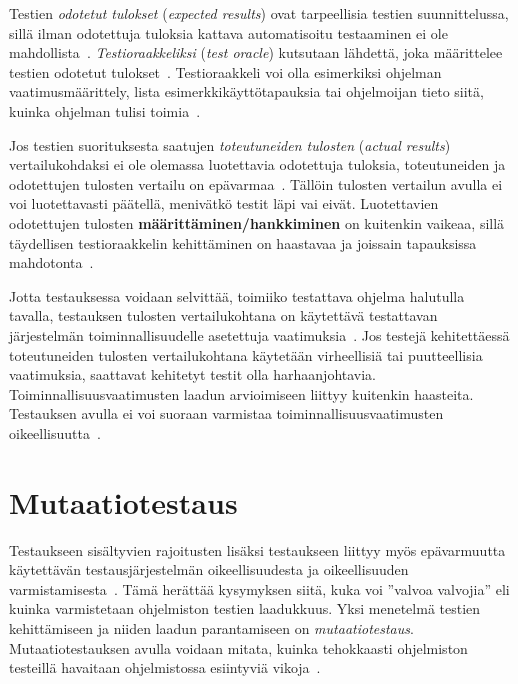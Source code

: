 \documentclass[finnish, grading]{tktltiki2}
\theoremstyle{definition}
\theoremstyle{remark}
\begin{document}
Testien \textit{odotetut tulokset} (\textit{expected results}) ovat tarpeellisia testien suunnittelussa, sillä ilman odotettuja tuloksia kattava automatisoitu testaaminen ei ole mahdollista~\cite[s. 917]{Binder:1999}. \textit{Testioraakkeliksi} (\textit{test oracle}) kutsutaan lähdettä, joka määrittelee testien odotetut tulokset~\cite[s. 917]{Binder:1999}. Testioraakkeli voi olla esimerkiksi ohjelman vaatimusmäärittely, lista esimerkkikäyttötapauksia tai ohjelmoijan tieto siitä, kuinka ohjelman tulisi toimia~\cite[s. 918]{Binder:1999}. 

Jos testien suorituksesta saatujen \textit{toteutuneiden tulosten} (\textit{actual results}) vertailukohdaksi ei ole olemassa luotettavia odotettuja tuloksia, toteutuneiden ja odotettujen tulosten vertailu on epävarmaa~\cite[s. 58]{Binder:1999}. Tällöin tulosten vertailun avulla ei voi luotettavasti päätellä, menivätkö testit läpi vai eivät. Luotettavien odotettujen tulosten \textbf{määrittäminen/hankkiminen} on kuitenkin vaikeaa, sillä täydellisen testioraakkelin kehittäminen on haastavaa ja joissain tapauksissa mahdotonta~\cite[s. 58, 918]{Binder:1999}.

Jotta testauksessa voidaan selvittää, toimiiko testattava ohjelma halutulla tavalla, testauksen tulosten vertailukohtana on käytettävä testattavan järjestelmän toiminnallisuudelle asetettuja vaatimuksia~\cite[s. 58]{Binder:1999}. Jos testejä kehitettäessä toteutuneiden tulosten vertailukohtana käytetään virheellisiä tai puutteellisia vaatimuksia, saattavat kehitetyt testit olla harhaanjohtavia. Toiminnallisuusvaatimusten laadun arvioimiseen liittyy kuitenkin haasteita. Testauksen avulla ei voi suoraan varmistaa toiminnallisuusvaatimusten oikeellisuutta~\cite[s. 58]{Binder:1999}.


\section{Mutaatiotestaus}

Testaukseen sisältyvien rajoitusten lisäksi testaukseen liittyy myös epävarmuutta käytettävän testausjärjestelmän oikeellisuudesta ja oikeellisuuden varmistamisesta~\cite[s. 209]{Manna:Waldinger:1978}. Tämä herättää kysymyksen siitä, kuka voi ''valvoa valvojia'' eli kuinka varmistetaan ohjelmiston testien laadukkuus. Yksi menetelmä testien kehittämiseen ja niiden laadun parantamiseen on \textit{mutaatiotestaus}. Mutaatiotestauksen avulla voidaan mitata, kuinka tehokkaasti ohjelmiston testeillä havaitaan ohjelmistossa esiintyviä vikoja~\cite[s. 649]{Jia:Harman:2011}.
\end{document}
